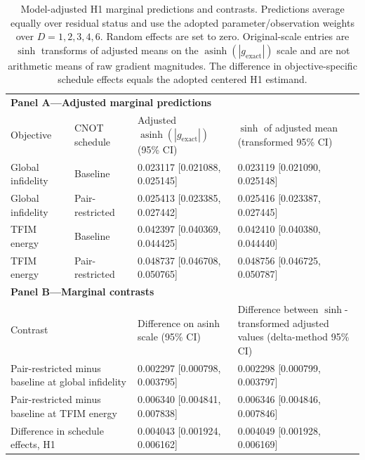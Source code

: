 \begin{table}[t]
\centering
\small
\caption{Model-adjusted H1 marginal predictions and contrasts. Predictions average equally over residual status and use the adopted parameter/observation weights over $D=1,2,3,4,6$. Random effects are set to zero. Original-scale entries are $\sinh$ transforms of adjusted means on the $\operatorname{asinh}(|g_{\mathrm{exact}}|)$ scale and are not arithmetic means of raw gradient magnitudes. The difference in objective-specific schedule effects equals the adopted centered H1 estimand.}
\label{tab:h1-marginal-effects}
\begin{tabularx}{\textwidth}{@{}llXX@{}}
\toprule
\multicolumn{4}{l}{\textbf{Panel A---Adjusted marginal predictions}}\\
Objective & CNOT schedule & Adjusted $\operatorname{asinh}(|g_{\mathrm{exact}}|)$ (95\% CI) & $\sinh$ of adjusted mean (transformed 95\% CI)\\
\midrule
Global infidelity & Baseline & 0.023117 [0.021088, 0.025145] & 0.023119 [0.021090, 0.025148]\\
Global infidelity & Pair-restricted & 0.025413 [0.023385, 0.027442] & 0.025416 [0.023387, 0.027445]\\
TFIM energy & Baseline & 0.042397 [0.040369, 0.044425] & 0.042410 [0.040380, 0.044440]\\
TFIM energy & Pair-restricted & 0.048737 [0.046708, 0.050765] & 0.048756 [0.046725, 0.050787]\\
\midrule
\multicolumn{4}{l}{\textbf{Panel B---Marginal contrasts}}\\
\multicolumn{2}{p{0.30\textwidth}}{Contrast} & Difference on asinh scale (95\% CI) & Difference between $\sinh$-transformed adjusted values (delta-method 95\% CI)\\
\midrule
\multicolumn{2}{p{0.30\textwidth}}{Pair-restricted minus baseline at global infidelity} & 0.002297 [0.000798, 0.003795] & 0.002298 [0.000799, 0.003797]\\
\multicolumn{2}{p{0.30\textwidth}}{Pair-restricted minus baseline at TFIM energy} & 0.006340 [0.004841, 0.007838] & 0.006346 [0.004846, 0.007846]\\
\multicolumn{2}{p{0.30\textwidth}}{Difference in schedule effects, H1} & 0.004043 [0.001924, 0.006162] & 0.004049 [0.001928, 0.006169]\\
\bottomrule
\end{tabularx}
\end{table}
